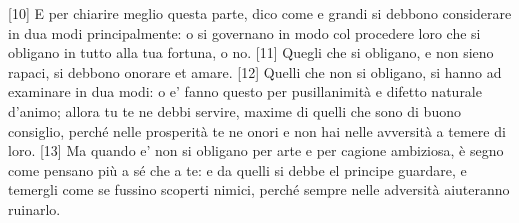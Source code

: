 {[}10{]} E per chiarire meglio questa parte, dico come e grandi si
debbono considerare in dua modi principalmente: o si governano in modo
col procedere loro che si obligano in tutto alla tua fortuna, o no.
{[}11{]} Quegli che si obligano, e non sieno rapaci, si debbono onorare
et amare. {[}12{]} Quelli che non si obligano, si hanno ad examinare in
dua modi: o e' fanno questo per pusillanimità e difetto naturale
d'animo; allora tu te ne debbi servire, maxime di quelli che sono di
buono consiglio, perché nelle prosperità te ne onori e non hai nelle
avversità a temere di loro. {[}13{]} Ma quando e' non si obligano per
arte e per cagione ambiziosa, è segno come pensano più a sé che a te: e
da quelli si debbe el principe guardare, e temergli come se fussino
scoperti nimici, perché sempre nelle adversità aiuteranno ruinarlo.

